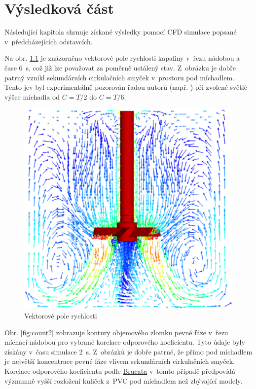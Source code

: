 \chapter{Výsledková část}
Následující kapitola shrnuje získané výsledky pomocí CFD simulace popsané v~předcházejících odstavcích. 

Na obr. \ref{fig:vecfield} je znázorněno vektorové pole rychlosti kapaliny v~řezu nádobou a čase \SI{6}{\second}, což již lze považovat za poměrně ustálený stav. Z~obrázku je dobře patrný vznikl sekundárních cirkulačních smyček v~prostoru pod míchadlem. Tento jev byl experimentálně pozorován řadou autorů (např. \citet{hos10}) při zvolené světlé výšce míchadla od $C=T/2$ do $C=T/6$.  

\begin{figure}[h!]
\begin{center}
\includegraphics[scale=0.45]{images/vecfield.eps}
\caption{Vektorové pole rychlosti}
\label{fig:vecfield}
\end{center}
\end{figure} 

\vspace{-12mm}
\newpage

Obr. \ref{fig:count2} zobrazuje kontury objemového zlomku pevné fáze v~řezu míchací nádobou pro vybrané korelace odporového koeficientu. Tyto údaje byly získány v~času simulace \SI{2}{\second}. Z~obrázků je dobře patrné, že přímo pod míchadlem je největší koncentrace pevné fáze vlivem sekundárních cirkulačních smyček. Korelace odporového koeficientu podle \hyperlink{hyp:cds}{Brucata} v~tomto případě předpovídá významně vyšší rozložení kuliček z~PVC pod míchadlem než zbývající modely.

